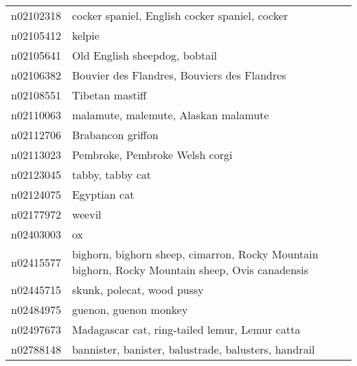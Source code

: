 \begin{appendices}
\begin{longtabu}{X|X[4]}
    		n02102318 &                                                                             cocker spaniel, English cocker spaniel, cocker \tabularnewline
    		n02105412 &                                                                                                                     kelpie \tabularnewline
    		n02105641 &                                                                                              Old English sheepdog, bobtail \tabularnewline
    		n02106382 &                                                                                Bouvier des Flandres, Bouviers des Flandres \tabularnewline
    		n02108551 &                                                                                                            Tibetan mastiff \tabularnewline
    		n02110063 &                                                                                       malamute, malemute, Alaskan malamute \tabularnewline
    		n02112706 &                                                                                                          Brabancon griffon \tabularnewline
    		n02113023 &                                                                                             Pembroke, Pembroke Welsh corgi \tabularnewline
    		n02123045 &                                                                                                           tabby, tabby cat \tabularnewline
    		n02124075 &                                                                                                               Egyptian cat \tabularnewline
    		n02177972 &                                                                                                                     weevil \tabularnewline
    		n02403003 &                                                                                                                         ox \tabularnewline
    		n02415577 &                            bighorn, bighorn sheep, cimarron, Rocky Mountain bighorn, Rocky Mountain sheep, Ovis canadensis \tabularnewline
    		n02445715 &                                                                                                 skunk, polecat, wood pussy \tabularnewline
    		n02484975 &                                                                                                      guenon, guenon monkey \tabularnewline
    		n02497673 &                                                                             Madagascar cat, ring-tailed lemur, Lemur catta \tabularnewline
    		n02788148 &                                                                       bannister, banister, balustrade, balusters, handrail \tabularnewline

\end{longtabu}
\end{appendices}
